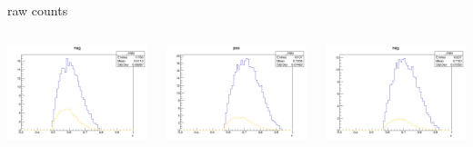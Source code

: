 \begin{frame}{raw counts}
\begin{columns}
\begin{column}[T]{0.25\textwidth}
\includegraphics[width = \textwidth]{results/yield/statistics/yield_x_Q2_z_0.45_3.898_0.60_neg.png}
\end{column}
\begin{column}[T]{0.25\textwidth}
\includegraphics[width = \textwidth]{results/yield/statistics/yield_x_Q2_z_0.45_3.898_0.70_pos.png}
\end{column}
\begin{column}[T]{0.25\textwidth}
\includegraphics[width = \textwidth]{results/yield/statistics/yield_x_Q2_z_0.45_3.898_0.70_neg.png}
\end{column}
\end{columns}
\end{frame}
